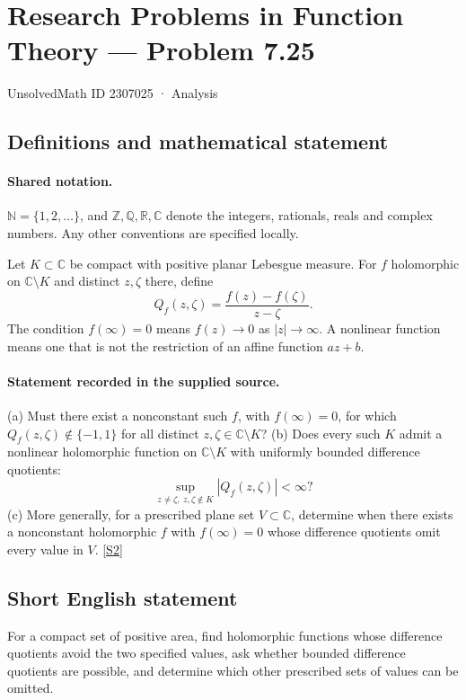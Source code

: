 \documentclass[11pt]{article}
\newcommand{\sref}[2]{\hyperlink{source:#1:#2}{[S#2]}}
\begin{document}
\setcounter{section}{2307024}
\section{Research Problems in Function Theory — Problem 7.25}\label{2307025}
{\small\sffamily UnsolvedMath ID 2307025 · Analysis}
\subsection{Definitions and mathematical statement}

\paragraph{Shared notation.}$\mathbb N=\{1,2,\ldots\}$, and $\mathbb Z,\mathbb Q,\mathbb R,\mathbb C$ denote the integers, rationals, reals and complex numbers. Any other conventions are specified locally.


Let $K\subset\mathbb C$ be compact with positive planar Lebesgue measure. For $f$ holomorphic on $\mathbb C\setminus K$ and distinct $z,\zeta$ there, define
\[Q_f(z,\zeta)=\frac{f(z)-f(\zeta)}{z-\zeta}.\]
The condition $f(\infty)=0$ means $f(z)\to0$ as $|z|\to\infty$. A nonlinear function means one that is not the restriction of an affine function $az+b$.

\paragraph{Statement recorded in the supplied source.}
(a) Must there exist a nonconstant such $f$, with $f(\infty)=0$, for which $Q_f(z,\zeta)\notin\{-1,1\}$ for all distinct $z,\zeta\in\mathbb C\setminus K$?
(b) Does every such $K$ admit a nonlinear holomorphic function on $\mathbb C\setminus K$ with uniformly bounded difference quotients:
\[\sup_{z\ne\zeta,\ z,\zeta\notin K}|Q_f(z,\zeta)|<\infty?\]
(c) More generally, for a prescribed plane set $V\subset\mathbb C$, determine when there exists a nonconstant holomorphic $f$ with $f(\infty)=0$ whose difference quotients omit every value in $V$. \sref{2307025}{2}

\subsection{Short English statement}
For a compact set of positive area, find holomorphic functions whose difference quotients avoid the two specified values, ask whether bounded difference quotients are possible, and determine which other prescribed sets of values can be omitted.
\end{document}
